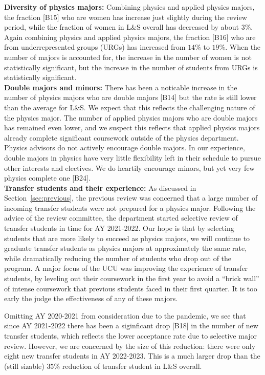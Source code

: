 \documentclass[12pt]{article}
\begin{document}
\noindent
{\bf Diversity of physics majors:}
Combining physics and applied physics majors, the fraction [B15] who
are women has increase just slightly during the review period, while
the fraction of women in L\&S overall has decreased by about $3\%$.
Again combining physics and applied physics majors, the fraction [B16]
who are from underrepresented groups (URGs) has increased from $14\%$
to $19\%$.  When the number of majors is accounted for, the increase
in the number of women is not statistically significant, but the
increase in the number of students from URGs is statistically
significant.\\[3pt]

\noindent
{\bf Double majors and minors:}
There has been a noticable increase in the number of physics majors
who are double majors [B14] but the rate is still lower than the
average for L\&S.  We expect that this reflects the challenging nature
of the physics major.  The number of applied physics majors who are
double majors has remained even lower, and we suspect this reflects
that applied physics majors already complete significant coursework
outside of the physics department.  Physics advisors do not actively
encourage double majors.  In our experience, double majors in physics
have very little flexibility left in their schedule to pursue other
interests and electives.  We do heartily encourage minors, but yet
very few physics complete one [B24].\\[3pt]

\noindent
{\bf Transfer students and their experience:}
As discussed in Section~\ref{sec:previous}, the previous review was
concerned that a large number of incoming transfer students were not
prepared for a physics major.  Following the advice of the review
committee, the department started selective review of transfer
students in time for AY 2021-2022.  Our hope is that by selecting
students that are more likely to succeed as physics majors, we will
continue to graduate transfer students as physics majors at
approximately the same rate, while dramatically reducing the number of
students who drop out of the program.  A major focus of the UCU was
improving the experience of transfer students, by leveling out their
coursework in the first year to avoid a ``brick wall'' of intense
coursework that previous students faced in their first quarter.  It is
too early the judge the effectiveness of any of these majors.

Omitting AY 2020-2021 from consideration due to the pandemic, we see
that since AY 2021-2022 there has been a siginficant drop [B18] in the
number of new transfer students, which reflects the lower acceptance
rate due to selective major review.  However, we are concerned by the
size of this reduction: there were only eight new transfer students in
AY 2022-2023.  This is a much larger drop than the (still sizable)
$35\%$ reduction of transfer student in L\&S overall.
\end{document}
